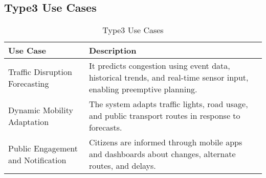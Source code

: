 \documentclass[a4paper,12pt]{article}
\begin{document}
\newpage

\subsection*{Type3 Use Cases}
\begin{table}[h!]
\centering
\begin{tabular}{|p{4.5cm}|p{8.5cm}|}
\hline
\textbf{Use Case} & \textbf{Description} \\
\hline
Traffic Disruption Forecasting & It predicts congestion using event data, historical trends, and real-time sensor input, enabling preemptive planning. \\
\hline
Dynamic Mobility Adaptation & The system adapts traffic lights, road usage, and public transport routes in response to forecasts. \\
\hline
Public Engagement and Notification & Citizens are informed through mobile apps and dashboards about changes, alternate routes, and delays. \\
\hline
\end{tabular}
\caption{Type3 Use Cases}
\end{table}
\end{document}
